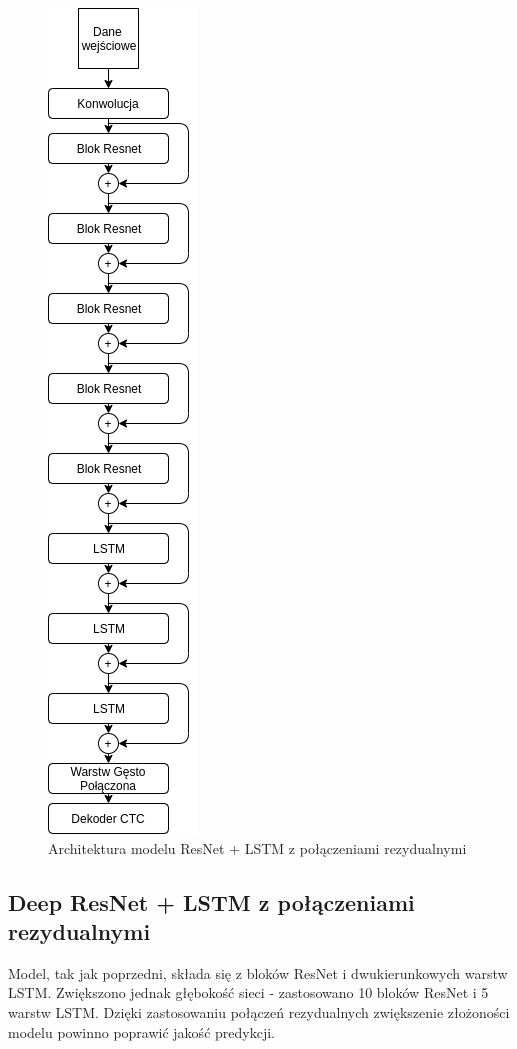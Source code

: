 \documentclass[a4paper,11pt,twoside]{report}
\theoremstyle{definition}
\begin{document}
\begin{figure}[h!]
	\centering
	\includegraphics[scale=0.7]{resnetLstm}
	\caption{Architektura modelu ResNet + LSTM z połączeniami rezydualnymi}
\end{figure}

\subsection{Deep ResNet + LSTM z połączeniami rezydualnymi}

Model, tak jak poprzedni, składa się z bloków ResNet i dwukierunkowych warstw LSTM. Zwiększono jednak głębokość sieci - zastosowano 10 bloków ResNet i 5 warstw LSTM. Dzięki zastosowaniu połączeń rezydualnych zwiększenie złożoności modelu powinno poprawić jakość predykcji.
\end{document}
